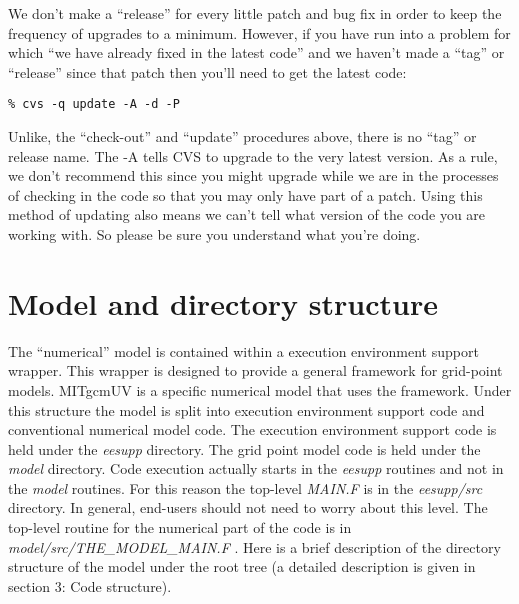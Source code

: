 We don't make a ``release'' for every little patch and bug fix in
order to keep the frequency of upgrades to a minimum. However, if you
have run into a problem for which ``we have already fixed in the
latest code'' and we haven't made a ``tag'' or ``release'' since that
patch then you'll need to get the latest code:
\begin{verbatim}
% cvs -q update -A -d -P
\end{verbatim}
Unlike, the ``check-out'' and ``update'' procedures above, there is no
``tag'' or release name. The -A tells CVS to upgrade to the
very latest version. As a rule, we don't recommend this since you
might upgrade while we are in the processes of checking in the code so
that you may only have part of a patch. Using this method of updating
also means we can't tell what version of the code you are working
with. So please be sure you understand what you're doing.

\section{Model and directory structure}

The ``numerical'' model is contained within a execution environment
support wrapper. This wrapper is designed to provide a general
framework for grid-point models. MITgcmUV is a specific numerical
model that uses the framework. Under this structure the model is split
into execution environment support code and conventional numerical
model code. The execution environment support code is held under the
\textit{eesupp} directory. The grid point model code is held under the
\textit{model} directory. Code execution actually starts in the
\textit{eesupp} routines and not in the \textit{model} routines. For
this reason the top-level
\textit{MAIN.F} is in the \textit{eesupp/src} directory. In general,
end-users should not need to worry about this level. The top-level routine
for the numerical part of the code is in \textit{model/src/THE\_MODEL\_MAIN.F%
}. Here is a brief description of the directory structure of the model under
the root tree (a detailed description is given in section 3: Code structure).

